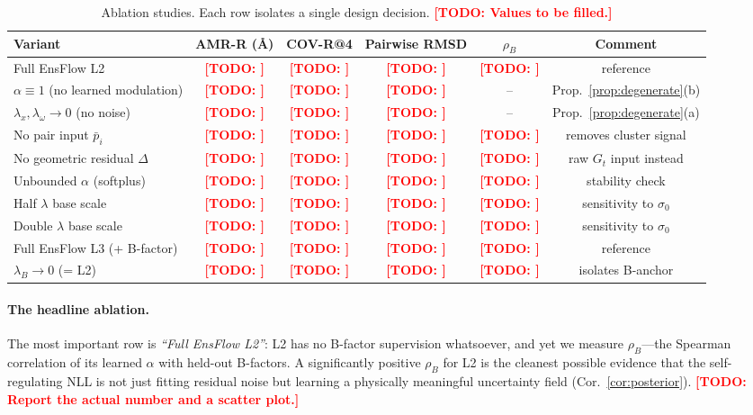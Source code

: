 \documentclass{article}
\theoremstyle{remark}
\theoremstyle{definition}
\newcommand{\todo}[1]{\textcolor{red}{\textbf{[TODO: #1]}}}
\begin{document}
\begin{table}[t]
\centering
\small
\caption{Ablation studies. Each row isolates a single design decision.
\todo{Values to be filled.}}
\label{tab:ablation}
\begin{tabular}{lccccc}
\toprule
Variant & AMR-R (\AA) & COV-R@4 & Pairwise RMSD & $\rho_B$ & Comment \\
\midrule
Full EnsFlow L2                 & \todo{}&\todo{}&\todo{}&\todo{}& reference \\
\midrule
$\alpha\equiv 1$ (no learned modulation) &\todo{}&\todo{}&\todo{}&--& Prop.\ \ref{prop:degenerate}(b) \\
$\lambda_x,\lambda_\omega\to 0$ (no noise)  &\todo{}&\todo{}&\todo{}&--& Prop.\ \ref{prop:degenerate}(a) \\
No pair input $\bar p_i$         &\todo{}&\todo{}&\todo{}&\todo{}& removes cluster signal \\
No geometric residual $\Delta$   &\todo{}&\todo{}&\todo{}&\todo{}& raw $G_t$ input instead \\
Unbounded $\alpha$ (softplus)    &\todo{}&\todo{}&\todo{}&\todo{}& stability check \\
Half $\lambda$ base scale        &\todo{}&\todo{}&\todo{}&\todo{}& sensitivity to $\sigma_0$ \\
Double $\lambda$ base scale      &\todo{}&\todo{}&\todo{}&\todo{}& sensitivity to $\sigma_0$ \\
\midrule
Full EnsFlow L3 (+ B-factor)    & \todo{}&\todo{}&\todo{}&\todo{}& reference \\
$\lambda_B\to 0$ (= L2)         &\todo{}&\todo{}&\todo{}&\todo{}& isolates B-anchor \\
\bottomrule
\end{tabular}
\end{table}

\paragraph{The headline ablation.}
The most important row is \emph{``Full EnsFlow L2''}: L2 has no B-factor
supervision whatsoever, and yet we measure $\rho_B$---the Spearman correlation
of its learned $\alpha$ with held-out B-factors. A significantly positive
$\rho_B$ for L2 is the cleanest possible evidence that the self-regulating NLL
is not just fitting residual noise but learning a physically meaningful
uncertainty field (Cor.~\ref{cor:posterior}). \todo{Report the actual number
and a scatter plot.}
\end{document}
